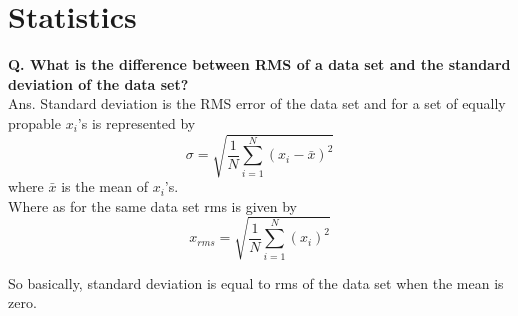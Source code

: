 \documentclass[11pt]{report}
\newcommand{\tbf}[1]{\textbf{#1}}
\begin{document}
\chapter{Statistics}
\tbf{Q. What is the difference between RMS of a data set and the standard deviation of the data set?}\\

Ans. Standard deviation is the RMS error of the data set and for a set of equally propable $x_i$'s is represented by
\begin{equation}
\sigma=\sqrt{\frac{1}{N}\sum_{i=1}^N(x_i-\bar{x})^2}
\end{equation}
where $\bar{x}$ is the mean of  $x_i$'s.\\

Where as for the same data set rms is given by
\begin{equation}
x_{rms}=\sqrt{\frac{1}{N}\sum_{i=1}^N(x_i)^2}
\end{equation}

So basically, standard deviation is equal to rms of the data set when the mean is zero.
\end{document}
